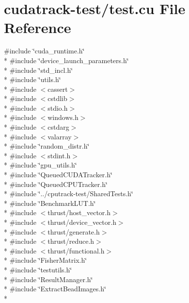 \hypertarget{test_8cu}{}\section{cudatrack-\/test/test.cu File Reference}
\label{test_8cu}
{\ttfamily \#include \char`\"{}cuda\+\_\+runtime.\+h\char`\"{}}\\*
{\ttfamily \#include \char`\"{}device\+\_\+launch\+\_\+parameters.\+h\char`\"{}}\\*
{\ttfamily \#include \char`\"{}std\+\_\+incl.\+h\char`\"{}}\\*
{\ttfamily \#include \char`\"{}utils.\+h\char`\"{}}\\*
{\ttfamily \#include $<$cassert$>$}\\*
{\ttfamily \#include $<$cstdlib$>$}\\*
{\ttfamily \#include $<$stdio.\+h$>$}\\*
{\ttfamily \#include $<$windows.\+h$>$}\\*
{\ttfamily \#include $<$cstdarg$>$}\\*
{\ttfamily \#include $<$valarray$>$}\\*
{\ttfamily \#include \char`\"{}random\+\_\+distr.\+h\char`\"{}}\\*
{\ttfamily \#include $<$stdint.\+h$>$}\\*
{\ttfamily \#include \char`\"{}gpu\+\_\+utils.\+h\char`\"{}}\\*
{\ttfamily \#include \char`\"{}Queued\+C\+U\+D\+A\+Tracker.\+h\char`\"{}}\\*
{\ttfamily \#include \char`\"{}Queued\+C\+P\+U\+Tracker.\+h\char`\"{}}\\*
{\ttfamily \#include \char`\"{}../cputrack-\/test/\+Shared\+Tests.\+h\char`\"{}}\\*
{\ttfamily \#include \char`\"{}Benchmark\+L\+U\+T.\+h\char`\"{}}\\*
{\ttfamily \#include $<$thrust/host\+\_\+vector.\+h$>$}\\*
{\ttfamily \#include $<$thrust/device\+\_\+vector.\+h$>$}\\*
{\ttfamily \#include $<$thrust/generate.\+h$>$}\\*
{\ttfamily \#include $<$thrust/reduce.\+h$>$}\\*
{\ttfamily \#include $<$thrust/functional.\+h$>$}\\*
{\ttfamily \#include \char`\"{}Fisher\+Matrix.\+h\char`\"{}}\\*
{\ttfamily \#include \char`\"{}testutils.\+h\char`\"{}}\\*
{\ttfamily \#include \char`\"{}Result\+Manager.\+h\char`\"{}}\\*
{\ttfamily \#include \char`\"{}Extract\+Bead\+Images.\+h\char`\"{}}\\*
